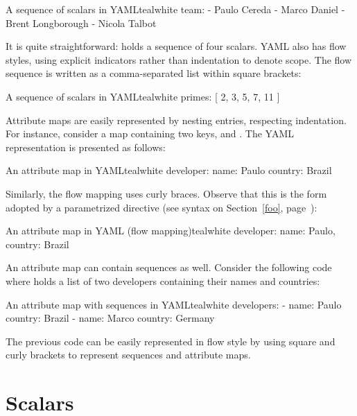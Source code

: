 \begin{codebox}{A sequence of scalars in YAML}{teal}{\icnote}{white}
team:
- Paulo Cereda
- Marco Daniel
- Brent Longborough
- Nicola Talbot
\end{codebox}

It is quite straightforward:  holds a sequence of four scalars. YAML also has flow styles, using explicit indicators rather than indentation to denote scope. The flow sequence is written as a comma-separated list within square brackets:

\begin{codebox}{A sequence of scalars in YAML}{teal}{\icnote}{white}
primes: [ 2, 3, 5, 7, 11 ]
\end{codebox}

Attribute maps are easily represented by nesting entries, respecting indentation. For instance, consider a map  containing two keys,  and . The YAML representation is presented as follows:

\begin{codebox}{An attribute map in YAML}{teal}{\icnote}{white}
developer:
 name: Paulo
 country: Brazil
\end{codebox}

Similarly, the flow mapping uses curly braces. Observe that this is the form adopted by a parametrized directive (see syntax on Section~\ref{foo}, page~\pageref{foo}):

\begin{codebox}{An attribute map in YAML (flow mapping)}{teal}{\icnote}{white}
developer: { name: Paulo, country: Brazil }
\end{codebox}

An attribute map can contain sequences as well. Consider the following code where  holds a list of two developers containing their names and countries:

\begin{codebox}{An attribute map with sequences in YAML}{teal}{\icnote}{white}
developers:
- name: Paulo
  country: Brazil
- name: Marco
  country: Germany
\end{codebox}

The previous code can be easily represented in flow style by using square and curly brackets to represent sequences and attribute maps.

\section{Scalars}
\label{sec:scalars}

